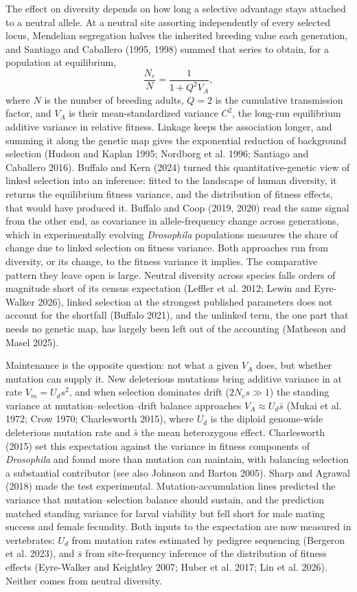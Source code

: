 \documentclass[12pt]{article}
\begin{document}
The effect on diversity depends on how long a selective advantage stays attached to a neutral allele. At a neutral site assorting independently of every selected locus, Mendelian segregation halves the inherited breeding value each generation, and Santiago and Caballero (1995, 1998) summed that series to obtain, for a population at equilibrium,
\begin{equation}
\frac{N_e}{N} = \frac{1}{1 + Q^2 V_A},
\end{equation}
where $N$ is the number of breeding adults, $Q = 2$ is the cumulative transmission factor, and $V_A$ is their mean-standardized variance $C^2$, the long-run equilibrium additive variance in relative fitness. Linkage keeps the association longer, and summing it along the genetic map gives the exponential reduction of background selection (Hudson and Kaplan 1995; Nordborg et al. 1996; Santiago and Caballero 2016). Buffalo and Kern (2024) turned this quantitative-genetic view of linked selection into an inference: fitted to the landscape of human diversity, it returns the equilibrium fitness variance, and the distribution of fitness effects, that would have produced it. Buffalo and Coop (2019, 2020) read the same signal from the other end, as covariance in allele-frequency change across generations, which in experimentally evolving \textit{Drosophila} populations measures the share of change due to linked selection on fitness variance. Both approaches run from diversity, or its change, to the fitness variance it implies. The comparative pattern they leave open is large. Neutral diversity across species falls orders of magnitude short of its census expectation (Leffler et al. 2012; Lewin and Eyre-Walker 2026), linked selection at the strongest published parameters does not account for the shortfall (Buffalo 2021), and the unlinked term, the one part that needs no genetic map, has largely been left out of the accounting (Matheson and Masel 2025).

Maintenance is the opposite question: not what a given $V_A$ does, but whether mutation can supply it. New deleterious mutations bring additive variance in at rate $V_m = U_d s^2$, and when selection dominates drift ($2N_e s \gg 1$) the standing variance at mutation--selection--drift balance approaches $V_A \approx U_d\bar{s}$ (Mukai et al. 1972; Crow 1970; Charlesworth 2015), where $U_d$ is the diploid genome-wide deleterious mutation rate and $\bar{s}$ the mean heterozygous effect. Charlesworth (2015) set this expectation against the variance in fitness components of \textit{Drosophila} and found more than mutation can maintain, with balancing selection a substantial contributor (see also Johnson and Barton 2005). Sharp and Agrawal (2018) made the test experimental. Mutation-accumulation lines predicted the variance that mutation--selection balance should sustain, and the prediction matched standing variance for larval viability but fell short for male mating success and female fecundity. Both inputs to the expectation are now measured in vertebrates: $U_d$ from mutation rates estimated by pedigree sequencing (Bergeron et al. 2023), and $\bar{s}$ from site-frequency inference of the distribution of fitness effects (Eyre-Walker and Keightley 2007; Huber et al. 2017; Lin et al. 2026). Neither comes from neutral diversity.
\end{document}
